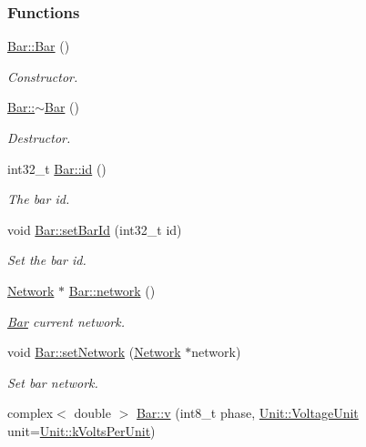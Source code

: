 \subsubsection*{Functions}
\begin{DoxyCompactItemize}
\item 
\hyperlink{group___models_ga9cae2188fcc6cce41caa7898c64548d1}{Bar\+::\+Bar} ()
\begin{DoxyCompactList}\small\item\em Constructor. \end{DoxyCompactList}\item 
\hyperlink{group___models_ga9c7ebea0c189423591741ac438985316}{Bar\+::$\sim$\+Bar} ()
\begin{DoxyCompactList}\small\item\em Destructor. \end{DoxyCompactList}\item 
int32\+\_\+t \hyperlink{group___models_gacf0fb781a73856bb7beb823304465e13}{Bar\+::id} ()
\begin{DoxyCompactList}\small\item\em The bar id. \end{DoxyCompactList}\item 
void \hyperlink{group___models_gae3cf341a76cc4589fe3203d0a3ed2ac0}{Bar\+::set\+Bar\+Id} (int32\+\_\+t id)
\begin{DoxyCompactList}\small\item\em Set the bar id. \end{DoxyCompactList}\item 
\hyperlink{class_network}{Network} $\ast$ \hyperlink{group___models_gab0594d5d7313e8749bb85434b255db9a}{Bar\+::network} ()
\begin{DoxyCompactList}\small\item\em \hyperlink{class_bar}{Bar} current network. \end{DoxyCompactList}\item 
void \hyperlink{group___models_gade9a307fdb6a81871787899ec1af5833}{Bar\+::set\+Network} (\hyperlink{class_network}{Network} $\ast$network)
\begin{DoxyCompactList}\small\item\em Set bar network. \end{DoxyCompactList}\item 
complex$<$ double $>$ \hyperlink{group___models_gab3ed62a7f2eb9c41a0b84543f1ef8d3b}{Bar\+::v} (int8\+\_\+t phase, \hyperlink{class_unit_a55b07dfa9457e1eca2c7194fe0cfc3c1}{Unit\+::\+Voltage\+Unit} unit=\hyperlink{class_unit_a55b07dfa9457e1eca2c7194fe0cfc3c1ab44b1310b59fdcdc9df5bbea91da4206}{Unit\+::k\+Volts\+Per\+Unit})

\end{DoxyCompactItemize}
